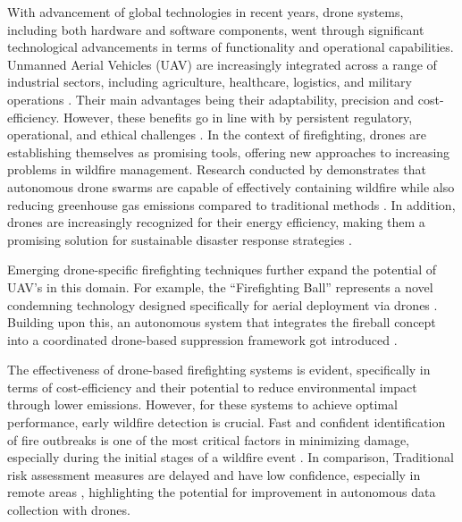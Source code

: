\documentclass[twoside]{article}
\begin{document}
With advancement of global technologies in recent years, drone systems, including both hardware and software components, went through  significant technological advancements  in terms of functionality and operational capabilities. Unmanned Aerial Vehicles (UAV) are increasingly integrated across a range of industrial sectors, including agriculture, healthcare, logistics, and military operations \citep{emimiCurrentOpportunitiesChallenges2023}. Their main advantages being their adaptability, precision and cost-efficiency. However, these benefits go in line with by persistent regulatory, operational, and ethical challenges \citep{emimiCurrentOpportunitiesChallenges2023}.
In the context of firefighting, drones are  establishing themselves as promising tools, offering new approaches to increasing problems in wildfire management. Research conducted by \citet{Saffre2022} demonstrates that autonomous drone swarms are capable of effectively containing wildfire while also reducing greenhouse gas emissions compared to traditional methods \citep{Saffre2022}. In addition, drones are increasingly recognized for their energy efficiency, making them a promising solution for sustainable disaster response strategies \citep{stolaroffEnergyUseLife2018}.

Emerging drone-specific firefighting techniques further expand the potential of UAV's in this domain. For example, the “Firefighting Ball” represents a novel condemning technology designed specifically for aerial deployment via drones \citep{fireBalls}. Building upon this, an autonomous system that integrates the fireball concept into a coordinated drone-based suppression framework got introduced \citep{alkhatibProposedAutomaticForest2024}.

The effectiveness of drone-based firefighting systems is evident, specifically in terms of cost-efficiency and their potential to reduce environmental impact through lower emissions. However, for these systems to achieve optimal performance, early wildfire detection is crucial. Fast and confident identification of fire outbreaks is one of the most critical factors in minimizing damage, especially during the initial stages of a wildfire event \citep{Sudhakar2020}.
In comparison, Traditional risk assessment measures are delayed and have low confidence, especially in remote areas \citep{Afghah2019}, highlighting the potential for improvement in autonomous data collection \citep{Lelis2024} with drones.
\end{document}
